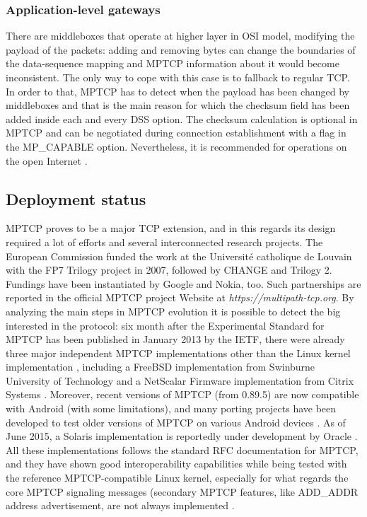 \subsubsection{Application-level gateways}
There are middleboxes that operate at higher layer in OSI model, modifying the payload of the packets: adding and removing bytes can change the boundaries of the data-sequence mapping and MPTCP information about it would become inconsistent. The only way to cope with this case is to fallback to regular TCP. In order to that, MPTCP has to detect when the payload has been changed by middleboxes and that is the main reason for which the checksum field has been added inside each and every DSS option. The checksum calculation is optional in MPTCP and can be negotiated during connection establishment with a flag in the MP\_CAPABLE option. Nevertheless, it is recommended for operations on the open Internet \cite{HDPDB13}.

\subsection{Deployment status}
MPTCP proves to be a major TCP extension, and in this regards its design required a lot of efforts and several interconnected research projects. The European Commission funded the work at the Université catholique de Louvain with the FP7 Trilogy project in 2007, followed by CHANGE and Trilogy 2. Fundings have been instantiated by Google and Nokia, too. Such partnerships are reported in the official MPTCP project Website at \textit{https://multipath-tcp.org}.
By analyzing the main steps in MPTCP evolution it is possible to detect the big interested in the protocol: six month after the Experimental Standard for MPTCP has been published in January 2013 by the IETF, there were already three major independent MPTCP implementations other than the Linux kernel implementation \cite{eardley-mptcp-implementations-survey-02}, including a FreeBSD implementation from Swinburne University of Technology \cite{caia} and a NetScalar Firmware implementation from Citrix Systems \cite{netscalar}.
Moreover, recent versions of MPTCP (from 0.89.5) are now compatible with Android (with some limitations), and many porting projects have been developed to test older versions of MPTCP on various Android devices \cite{mptcpandroid}.
As of June 2015, a Solaris implementation is reportedly under development by Oracle \cite{mptcpsolaris}.
All these implementations follows the standard RFC documentation for MPTCP, and they have shown good interoperability capabilities while being tested with the reference MPTCP-compatible Linux kernel, especially for what regards the core MPTCP signaling messages (secondary MPTCP features, like ADD\_ADDR address advertisement, are not always implemented \cite{eardley-mptcp-implementations-survey-02}.

